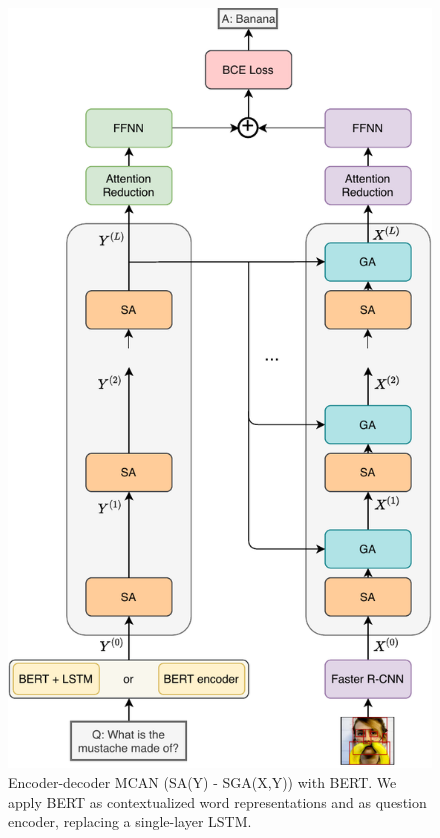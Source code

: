 \documentclass{article}
\begin{document}
\begin{figure}[ht]
	\centering
	\includegraphics[scale=0.7]{enc-dec_mcan_bert}
	\caption{Encoder-decoder MCAN (SA(Y) - SGA(X,Y)) with BERT. We apply BERT as contextualized word representations and as question encoder, replacing a single-layer LSTM.}
	\label{fig:mcan_bert}
\end{figure}
\end{document}
